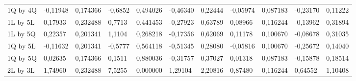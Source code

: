 \begin{table}[]
{\begin{tabular}{lllllllllll}
\rowcolor[HTML]{FFFFFF} 
{\color[HTML]{000000} 1Q by 4Q}       & {\color[HTML]{181A1B} -0,11948} & {\color[HTML]{181A1B} 0,174366} & {\color[HTML]{181A1B} -0,6852}  & {\color[HTML]{181A1B} 0,494026} & {\color[HTML]{181A1B} -0,46340}       & {\color[HTML]{181A1B} 0,22444}        & {\color[HTML]{181A1B} -0,05974} & {\color[HTML]{181A1B} 0,087183}      & {\color[HTML]{181A1B} -0,23170}       & {\color[HTML]{181A1B} 0,11222}        \\
\rowcolor[HTML]{FFFFFF} 
{\color[HTML]{000000} 1L by 5L}       & {\color[HTML]{181A1B} 0,17933}  & {\color[HTML]{181A1B} 0,232488} & {\color[HTML]{181A1B} 0,7713}   & {\color[HTML]{181A1B} 0,441453} & {\color[HTML]{181A1B} -0,27923}       & {\color[HTML]{181A1B} 0,63789}        & {\color[HTML]{181A1B} 0,08966}  & {\color[HTML]{181A1B} 0,116244}      & {\color[HTML]{181A1B} -0,13962}       & {\color[HTML]{181A1B} 0,31894}        \\
\rowcolor[HTML]{FFFFFF} 
{\color[HTML]{000000} 1L by 5Q}       & {\color[HTML]{181A1B} 0,22357}  & {\color[HTML]{181A1B} 0,201341} & {\color[HTML]{181A1B} 1,1104}   & {\color[HTML]{181A1B} 0,268218} & {\color[HTML]{181A1B} -0,17356}       & {\color[HTML]{181A1B} 0,62069}        & {\color[HTML]{181A1B} 0,11178}  & {\color[HTML]{181A1B} 0,100670}      & {\color[HTML]{181A1B} -0,08678}       & {\color[HTML]{181A1B} 0,31035}        \\
\rowcolor[HTML]{FFFFFF} 
{\color[HTML]{000000} 1Q by 5L}       & {\color[HTML]{181A1B} -0,11632} & {\color[HTML]{181A1B} 0,201341} & {\color[HTML]{181A1B} -0,5777}  & {\color[HTML]{181A1B} 0,564118} & {\color[HTML]{181A1B} -0,51345}       & {\color[HTML]{181A1B} 0,28080}        & {\color[HTML]{181A1B} -0,05816} & {\color[HTML]{181A1B} 0,100670}      & {\color[HTML]{181A1B} -0,25672}       & {\color[HTML]{181A1B} 0,14040}        \\
\rowcolor[HTML]{FFFFFF} 
{\color[HTML]{000000} 1Q by 5Q}       & {\color[HTML]{181A1B} 0,02635}  & {\color[HTML]{181A1B} 0,174366} & {\color[HTML]{181A1B} 0,1511}   & {\color[HTML]{181A1B} 0,880036} & {\color[HTML]{181A1B} -0,31757}       & {\color[HTML]{181A1B} 0,37027}        & {\color[HTML]{181A1B} 0,01318}  & {\color[HTML]{181A1B} 0,087183}      & {\color[HTML]{181A1B} -0,15878}       & {\color[HTML]{181A1B} 0,18514}        \\
\rowcolor[HTML]{FFFFFF} 
{\color[HTML]{000000} 2L by 3L}       & {\color[HTML]{FF0000} 1,74960}  & {\color[HTML]{FF0000} 0,232488} & {\color[HTML]{FF0000} 7,5255}   & {\color[HTML]{FF0000} 0,000000} & {\color[HTML]{FF0000} 1,29104}        & {\color[HTML]{FF0000} 2,20816}        & {\color[HTML]{FF0000} 0,87480}  & {\color[HTML]{FF0000} 0,116244}      & {\color[HTML]{FF0000} 0,64552}        & {\color[HTML]{FF0000} 1,10408}        \\

\end{tabular}}
\end{table}
